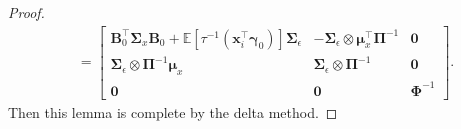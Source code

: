\documentclass[10pt,a4paper]{amsart}
\newcommand{\IdenMat}{\textbf{I}}
\newcommand{\LogCoe}{\boldsymbol{\gamma}}
\newcommand{\ObsCov}{\textbf{x}_i}
\begin{document}
\begin{proof}
\begin{align*}
                &=  \begin{bmatrix}
                        \textbf{B}^{\top}_0 \boldsymbol{\Sigma}_{x} \textbf{B}_0 + \mathbb{E} [\tau^{-1}(\ObsCov^{\top}\LogCoe_0)] \boldsymbol{\Sigma}_{\epsilon} &  -\boldsymbol{\Sigma}_{\epsilon} \otimes \boldsymbol{\mu}_x^{\top} \boldsymbol{\Pi}^{-1}  & \textbf{0} \\ 
                        \boldsymbol{\Sigma}_{\epsilon} \otimes \boldsymbol{\Pi}^{-1}\boldsymbol{\mu}_x & \boldsymbol{\Sigma}_{\epsilon} \otimes \boldsymbol{\Pi}^{-1} & \textbf{0} \\ 
                        \textbf{0} & \textbf{0} & \boldsymbol{\Phi}^{-1} 
                    \end{bmatrix}.
            \end{align*}
        Then this lemma is complete by the delta method.
    \end{proof}
\end{document}
